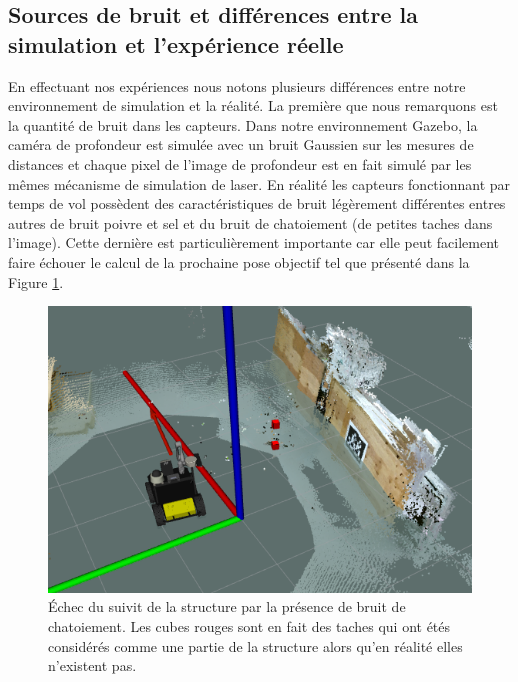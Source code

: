 \subsection{Sources de bruit et différences entre la simulation et l'expérience réelle}

En effectuant nos expériences nous notons plusieurs différences entre notre environnement de simulation et la réalité. La première que nous remarquons est la quantité de bruit dans les capteurs. Dans notre environnement Gazebo, la caméra de profondeur est simulée avec un bruit Gaussien sur les mesures de distances et chaque pixel de l'image de profondeur est en fait simulé par les mêmes mécanisme de simulation de laser. En réalité les capteurs fonctionnant par temps de vol possèdent des caractéristiques de bruit légèrement différentes entres autres de bruit poivre et sel et du bruit de chatoiement (de petites taches dans l'image). Cette dernière est particulièrement importante car elle peut facilement faire échouer le calcul de la prochaine pose objectif tel que présenté dans la Figure \ref{fig:speckle_fail}.

\begin{figure}[!th]
  \centering
  \includegraphics[width=0.7\linewidth]{images/speckle.png}
  \caption{Échec du suivit de la structure par la présence de bruit de chatoiement. Les cubes rouges sont en fait des taches qui ont étés considérés comme une partie de la structure alors qu'en réalité elles n'existent pas.}
  \label{fig:speckle_fail}
\end{figure}

